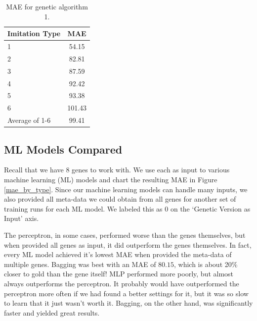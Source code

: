 \begin{table}[center]
	\centering
	\begin{center}
		\begin{tabular}{|l|c|} \hline
			\textbf{Imitation Type}	&	{MAE}		\\ \hline \hline
			1			&	54.15		\\ \hline
			2			&	82.81		\\ \hline
			3			&	87.59		\\ \hline
			4			&	92.42		\\ \hline
			5			&	93.38		\\ \hline
			6			&	101.43		\\ \hline
			Average of 1-6		&	99.41		\\ \hline
		\end{tabular}
	\end{center}
	\caption{MAE for genetic algorithm 1.}
	\label{tab:best-for-each}
\end{table}

\clearpage

\subsection{ML Models Compared}
Recall that we have 8 genes to work with. We use each as input to various machine learning (ML) models and chart the resulting MAE in Figure \ref{mae_by_type}. Since our machine learning models can handle many inputs, we also provided all meta-data we could obtain from all genes for another set of training runs for each ML model. We labeled this as 0 on the `Genetic Version as Input' axis. 

The perceptron, in some cases, performed worse than the genes themselves, but when provided all genes as input, it did outperform the genes themselves. In fact, every ML model achieved it's lowest MAE when provided the meta-data of multiple genes. Bagging was best with an MAE of $80.15$, which is about 20\% closer to gold than the gene itself! MLP performed more poorly, but almost always outperforms the perceptron. It probably would have outperformed the perceptron more often if we had found a better settings for it, but it was so slow to learn that it just wasn't worth it. Bagging, on the other hand, was significantly faster and yielded great results.

